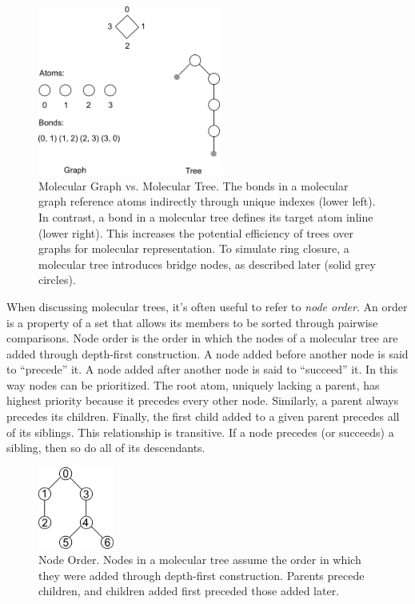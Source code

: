 \documentclass{article}
\begin{document}
\begin{figure}
    \centering
    \includegraphics[width=6cm]{molecular-graph-vs-tree.pdf}
    \caption{Molecular Graph vs. Molecular Tree. The bonds in a molecular graph reference atoms indirectly through unique indexes (lower left). In contrast, a bond in a molecular tree defines its target atom inline (lower right). This increases the potential efficiency of trees over graphs for molecular representation. To simulate ring closure, a molecular tree introduces bridge nodes, as described later (solid grey circles).}
    \label{fig:molecular-graph-vs-tree}
\end{figure}

When discussing molecular trees, it's often useful to refer to \textit{node order}. An order is a property of a set that allows its members to be sorted through pairwise comparisons. Node order is the order in which the nodes of a molecular tree are added through depth-first construction. A node added before another node is said to \enquote{precede} it. A node added after another node is said to \enquote{succeed} it. In this way nodes can be prioritized. The root atom, uniquely lacking a parent, has highest priority because it precedes every other node. Similarly, a parent always precedes its children. Finally, the first child added to a given parent precedes all of its siblings. This relationship is transitive. If a node precedes (or succeeds) a sibling, then so do all of its descendants.

\begin{figure}
    \centering
    \includegraphics[width=2.5cm]{node-order.pdf}
    \caption{Node Order. Nodes in a molecular tree assume the order in which they were added through depth-first construction. Parents precede children, and children added first preceded those added later.}
    \label{fig:node-order}
\end{figure}
\end{document}
